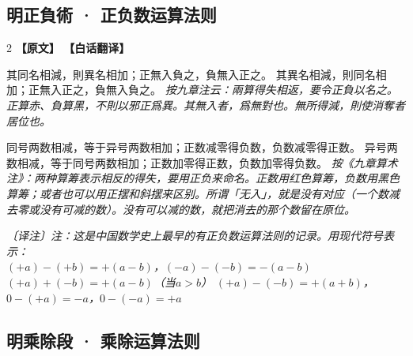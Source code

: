 \documentclass[11pt,a4paper]{article}
\newcommand{\noteMOD}[1]{\par\textcolor{notecolor}{\small\textit{〔译注〕#1}}\par\smallskip}
\begin{document}
\medskip

\subsection{明正負術 · 正负数运算法则}

\begin{paracol}{2}
\noindent\textbf{\textcolor{leftlabel}{【原文】}}
\switchcolumn
\noindent\textbf{\textcolor{rightlabel}{【白话翻译】}}
\switchcolumn*

其同名相減，則異名相加；正無入負之，負無入正之。\break
其異名相減，則同名相加；正無入正之，負無入負之。\break
\textit{按九章注云：兩算得失相返，要令正負以名之。正算赤、負算黑，不則以邪正爲異。其無入者，爲無對也。無所得減，則使消奪者居位也。}

\switchcolumn

同号两数相减，等于异号两数相加；正数减零得负数，负数减零得正数。\break
异号两数相减，等于同号两数相加；正数加零得正数，负数加零得负数。\break
\textit{按《九章算术注》：两种算筹表示相反的得失，要用正负来命名。正数用红色算筹，负数用黑色算筹；或者也可以用正摆和斜摆来区别。所谓「无入」，就是没有对应（一个数减去零或没有可减的数）。没有可以减的数，就把消去的那个数留在原位。}

\noteMOD{注：这是中国数学史上最早的有正负数运算法则的记录。用现代符号表示：\\
$(+a) - (+b) = +(a-b)$，$(-a) - (-b) = -(a-b)$\break
$(+a) + (-b) = +(a-b)$（当$a>b$）\break
$(+a) - (-b) = +(a+b)$，$0 - (+a) = -a$，$0 - (-a) = +a$}

\end{paracol}

\medskip

\subsection{明乘除段 · 乘除运算法则}
\end{document}
